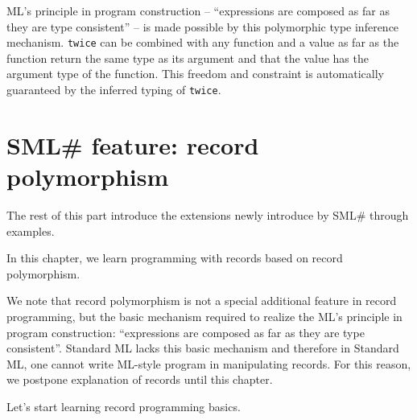 \documentclass{jbook}
\newif\ifjp
\newcommand{\txt}[2]{#2}
\newcommand{\smlsharp}{SML\#}
\begin{document}
	ML's principle in program construction -- ``expressions are
composed as far as they are type consistent'' -- is made possible by
this polymorphic type inference mechanism.
	{\tt twice} can be combined with any function and a value as far
as the function return the same type as its argument and that the value
has the argument type of the function.
	This freedom and constraint is automatically guaranteed by the
inferred typing of {\tt twice}.
\fi%

\chapter{
\txt{\smlsharp{}の拡張機能：レコード多相性}
    {\smlsharp{} feature: record polymorphism}
}
\label{chap:tutorialRecordpolymorphism}

\ifjp%
	本章以降の各章では，
\smlsharp{}で導入されたStandard MLの拡張機能を例を用いて説明します．

	まず本章では，レコード多相性を基礎としたMLでのレコードを用いたプ
ログラミングを学びます．
	レコード多相性は，特別な付加機能ではなく，MLの原則「式は型が正し
い限り自由に組み合わせることができる」に従ってレコードを含むプログラミ
ングを行う上での基本機能です．
	Standard MLにはこの機能が欠けているため，レコードの特性を生かし
たMLスタイルのプログラムが書けませんでした．
	この理由から，本書では，レコードの説明を遅延していました．
	まず，レコードの基礎から学びましょう．
\else%
	The rest of this part introduce the extensions newly introduce
by \smlsharp{} through examples.

	In this chapter, we learn programming with records based on 
record polymorphism.

	We note that record polymorphism is not a special additional
feature in record programming, but the basic mechanism required to
realize the ML's principle in program construction: ``expressions are
composed as far as they are type consistent''.
	Standard ML lacks this basic mechanism and therefore in Standard
ML, one cannot write ML-style program in manipulating records.
	For this reason, we postpone explanation of records until this
chapter.

	Let's start learning record programming basics.
\fi%
\end{document}

